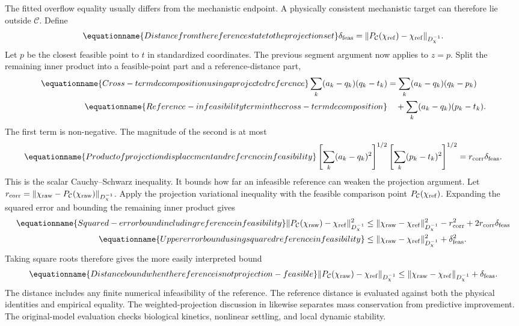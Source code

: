 The fitted overflow equality usually differs from the mechanistic endpoint. A physically consistent mechanistic target can therefore lie outside $\mathcal C$. Define
\begin{equation}
\equationname{Distance from the reference state to the projection set}
\delta_{\rm feas}=\|P_{\mathcal C}(\chi_{\rm ref})-\chi_{\rm ref}\|_{D_\chi^{-1}}.
\end{equation}
Let $p$ be the closest feasible point to $t$ in standardized coordinates. The previous segment argument now applies to $z=p$. Split the remaining inner product into a feasible-point part and a reference-distance part,
\begin{align}
\equationname{Cross-term decomposition using a projected reference}
\sum_k(a_k-q_k)(q_k-t_k)
&=\sum_k(a_k-q_k)(q_k-p_k)\\
\equationname{Reference-infeasibility term in the cross-term decomposition}
&\quad+\sum_k(a_k-q_k)(p_k-t_k).
\end{align}
The first term is non-negative. The magnitude of the second is at most
\begin{equation}
\equationname{Product of projection displacement and reference infeasibility}
\left[\sum_k(a_k-q_k)^2\right]^{1/2}
\left[\sum_k(p_k-t_k)^2\right]^{1/2}
=r_{\rm corr}\delta_{\rm feas}.
\end{equation}
This is the scalar Cauchy--Schwarz inequality. It bounds how far an infeasible reference can weaken the projection argument. Let $r_{\rm corr}=\|\chi_{\rm raw}-P_{\mathcal C}(\chi_{\rm raw})\|_{D_\chi^{-1}}$. Apply the projection variational inequality with the feasible comparison point $P_{\mathcal C}(\chi_{\rm ref})$. Expanding the squared error and bounding the remaining inner product gives
\begin{align}
\equationname{Squared-error bound including reference infeasibility}
\|P_{\mathcal C}(\chi_{\rm raw})-\chi_{\rm ref}\|_{D_\chi^{-1}}^2
&\le\|\chi_{\rm raw}-\chi_{\rm ref}\|_{D_\chi^{-1}}^2
-r_{\rm corr}^2+2r_{\rm corr}\delta_{\rm feas}\\
\equationname{Upper error bound using squared reference infeasibility}
&\le\|\chi_{\rm raw}-\chi_{\rm ref}\|_{D_\chi^{-1}}^2+\delta_{\rm feas}^2.
\end{align}
Taking square roots therefore gives the more easily interpreted bound
\begin{equation}
\equationname{Distance bound when the reference is not projection-feasible}
\|P_{\mathcal C}(\chi_{\rm raw})-\chi_{\rm ref}\|_{D_\chi^{-1}}
\le\|\chi_{\rm raw}-\chi_{\rm ref}\|_{D_\chi^{-1}}+\delta_{\rm feas}.
\label{eq:plant_projection_error_general}
\end{equation}
The distance includes any finite numerical infeasibility of the reference. The reference distance is evaluated against both the physical identities and empirical equality. The weighted-projection discussion in \citet{SturmSilva2024} likewise separates mass conservation from predictive improvement. The original-model evaluation checks biological kinetics, nonlinear settling, and local dynamic stability.

